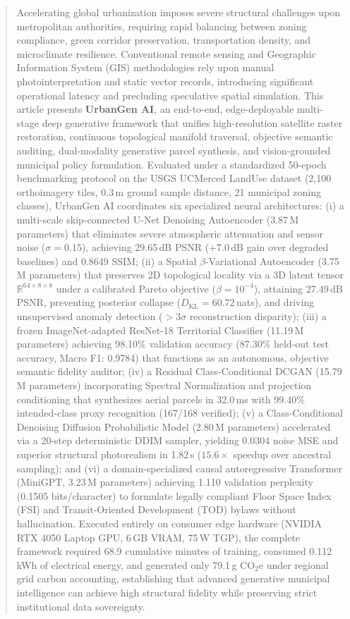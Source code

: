 \documentclass[journal]{IEEEtran}
\begin{document}
\begin{abstract}
Accelerating global urbanization imposes severe structural challenges upon metropolitan authorities, requiring rapid balancing between zoning compliance, green corridor preservation, transportation density, and microclimate resilience. Conventional remote sensing and Geographic Information System (GIS) methodologies rely upon manual photointerpretation and static vector records, introducing significant operational latency and precluding speculative spatial simulation. This article presents \textbf{UrbanGen AI}, an end-to-end, edge-deployable multi-stage deep generative framework that unifies high-resolution satellite raster restoration, continuous topological manifold traversal, objective semantic auditing, dual-modality generative parcel synthesis, and vision-grounded municipal policy formulation. Evaluated under a standardized 50-epoch benchmarking protocol on the USGS UCMerced LandUse dataset (2,100 orthoimagery tiles, 0.3\,m ground sample distance, 21 municipal zoning classes), UrbanGen AI coordinates six specialized neural architectures: (i) a multi-scale skip-connected U-Net Denoising Autoencoder (3.87\,M parameters) that eliminates severe atmospheric attenuation and sensor noise ($\sigma = 0.15$), achieving 29.65\,dB PSNR (+7.0\,dB gain over degraded baselines) and 0.8649 SSIM; (ii) a Spatial $\beta$-Variational Autoencoder (3.75\,M parameters) that preserves 2D topological locality via a 3D latent tensor $\mathbb{R}^{64 \times 8 \times 8}$ under a calibrated Pareto objective ($\beta = 10^{-4}$), attaining 27.49\,dB PSNR, preventing posterior collapse ($D_{\text{KL}} = 60.72$\,nats), and driving unsupervised anomaly detection ($>3\sigma$ reconstruction disparity); (iii) a frozen ImageNet-adapted ResNet-18 Territorial Classifier (11.19\,M parameters) achieving 98.10\% validation accuracy (87.30\% held-out test accuracy, Macro F1: 0.9784) that functions as an autonomous, objective semantic fidelity auditor; (iv) a Residual Class-Conditional DCGAN (15.79\,M parameters) incorporating Spectral Normalization and projection conditioning that synthesizes aerial parcels in 32.0\,ms with 99.40\% intended-class proxy recognition (167/168 verified); (v) a Class-Conditional Denoising Diffusion Probabilistic Model (2.80\,M parameters) accelerated via a 20-step deterministic DDIM sampler, yielding 0.0304 noise MSE and superior structural photorealism in 1.82\,s ($15.6\times$ speedup over ancestral sampling); and (vi) a domain-specialized causal autoregressive Transformer (MiniGPT, 3.23\,M parameters) achieving 1.110 validation perplexity (0.1505 bits/character) to formulate legally compliant Floor Space Index (FSI) and Transit-Oriented Development (TOD) bylaws without hallucination. Executed entirely on consumer edge hardware (NVIDIA RTX 4050 Laptop GPU, 6\,GB VRAM, 75\,W TGP), the complete framework required 68.9 cumulative minutes of training, consumed 0.112\,kWh of electrical energy, and generated only 79.1\,g CO$_2$e under regional grid carbon accounting, establishing that advanced generative municipal intelligence can achieve high structural fidelity while preserving strict institutional data sovereignty.
\end{abstract}
\end{document}
